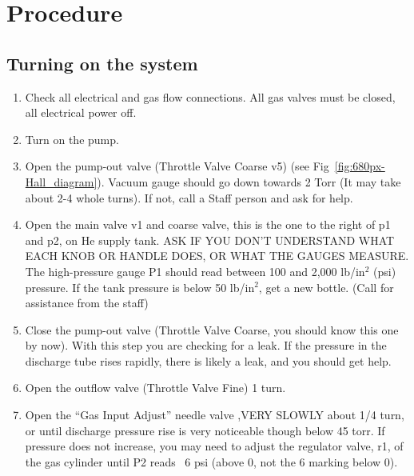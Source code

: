 \documentclass{../lab}
\begin{document}

\section{Procedure}

\subsection{Turning on the system}

\begin{enumerate}
    \item Check all electrical and gas flow connections. All gas valves must be closed, all electrical power off.

    \item Turn on the pump.

    \item Open the pump-out valve (Throttle Valve Coarse v5) (see Fig~\ref{fig:680px-Hall_diagram}). Vacuum gauge should go down towards 2 Torr (It may take about 2-4 whole turns). If not, call a Staff person and ask for help.

    \item Open the main valve v1 and coarse valve, this is the one to the right of p1 and p2, on He supply tank. ASK IF YOU DON'T UNDERSTAND WHAT EACH KNOB OR HANDLE DOES, OR WHAT THE GAUGES MEASURE. The high-pressure gauge P1 should read between 100 and 2,000 lb/in$^2$ (psi) pressure. If the tank pressure is below 50 lb/in$^2$, get a new bottle. (Call for assistance from the staff)

    \item Close the pump-out valve (Throttle Valve Coarse, you should know this one by now). With this step you are checking for a leak. If the pressure in the discharge tube rises rapidly, there is likely a leak, and you should get help.

    \item Open the outflow valve (Throttle Valve Fine) 1 turn.

    \item Open the ``Gas Input Adjust'' needle valve ,VERY SLOWLY about 1/4 turn, or until discharge pressure rise is very noticeable though below 45 torr. If pressure does not increase, you may need to adjust the regulator valve, r1, of the gas cylinder until P2 reads ~6 psi (above 0, not the 6 marking below 0).


\end{enumerate}
\end{document}
